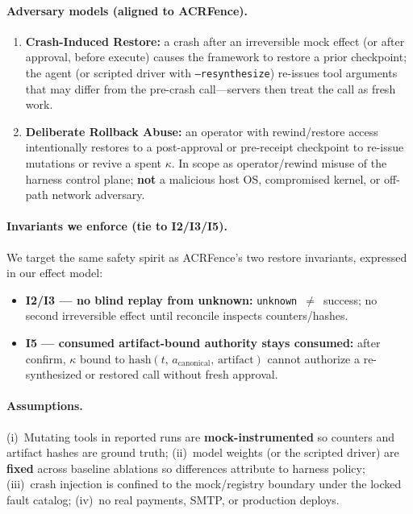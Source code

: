 \documentclass[11pt,a4paper]{article}
\begin{document}
\paragraph{Adversary models (aligned to ACRFence).}
\begin{enumerate}
\item \textbf{Crash-Induced Restore:} a crash after an irreversible mock
  effect (or after approval, before execute) causes the framework to restore
  a prior checkpoint; the agent (or scripted driver with
  \texttt{--resynthesize}) re-issues tool arguments that may differ from the
  pre-crash call---servers then treat the call as fresh work.
\item \textbf{Deliberate Rollback Abuse:} an operator with rewind/restore
  access intentionally restores to a post-approval or pre-receipt checkpoint
  to re-issue mutations or revive a spent $\kappa$. In scope as
  operator/rewind misuse of the harness control plane; \textbf{not} a
  malicious host OS, compromised kernel, or off-path network adversary.
\end{enumerate}

\paragraph{Invariants we enforce (tie to I2/I3/I5).}
We target the same safety spirit as ACRFence's two restore invariants,
expressed in our effect model:
\begin{itemize}
\item \textbf{I2/I3 --- no blind replay from unknown:}
  \texttt{unknown}~$\neq$~success; no second irreversible effect until
  reconcile inspects counters/hashes.
\item \textbf{I5 --- consumed artifact-bound authority stays consumed:}
  after confirm, $\kappa$ bound to
  $\mathrm{hash}(t,\,a_{\mathrm{canonical}},\,\mathrm{artifact})$ cannot
  authorize a re-synthesized or restored call without fresh approval.
\end{itemize}

\paragraph{Assumptions.}
(i)~Mutating tools in reported runs are \textbf{mock-instrumented} so
counters and artifact hashes are ground truth; (ii)~model weights (or the
scripted driver) are \textbf{fixed} across baseline ablations so differences
attribute to harness policy; (iii)~crash injection is confined to the
mock/registry boundary under the locked fault catalog; (iv)~no real
payments, SMTP, or production deploys.
\end{document}
